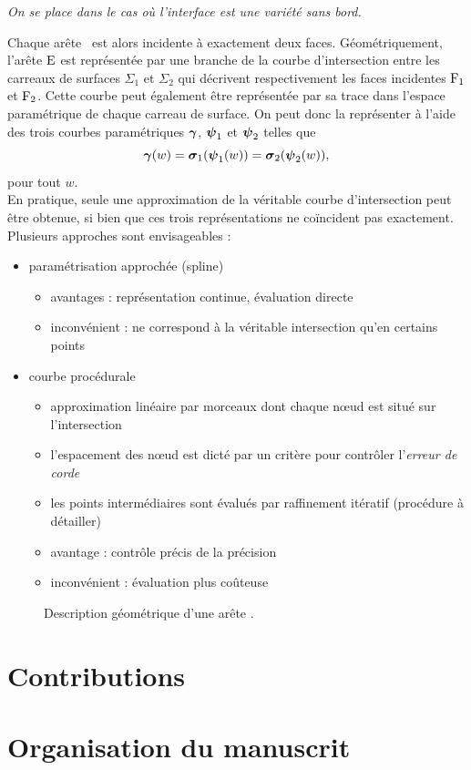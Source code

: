 \par\bigskip
\textit{On se place dans le cas où l'interface est une variété sans bord.}\par
Chaque arête \brep\ est alors incidente à exactement deux faces. 
Géométriquement, l'arête $\mathrm{E}$ est représentée par une branche de la courbe d'intersection entre les carreaux de surfaces $\Sigma_1$ et $\Sigma_2$ qui décrivent respectivement les faces incidentes $\mathrm{F}_1$ et $\mathrm{F}_2$. 
Cette courbe peut également être représentée par sa trace dans l'espace paramétrique de chaque carreau de surface. 
On peut donc la représenter à l'aide des trois courbes paramétriques $\boldsymbol{\gamma}$, $\boldsymbol{\psi}_1$ et $\boldsymbol{\psi}_2$ telles que
\begin{equation}
	\boldsymbol{\gamma}(w) = \boldsymbol{\sigma}_1(\boldsymbol{\psi}_1(w)) = \boldsymbol{\sigma}_2(\boldsymbol{\psi}_2(w)),
\end{equation}
pour tout $w$.\\
En pratique, seule une approximation de la véritable courbe d'intersection peut être obtenue, si bien que ces trois représentations ne coïncident pas exactement.
Plusieurs approches sont envisageables :
\begin{itemize}
	\item paramétrisation approchée (\eg spline)
	\begin{itemize}
		\item avantages : représentation continue, évaluation directe
		\item inconvénient : ne correspond à la véritable intersection qu'en certains points
	\end{itemize}
	\item courbe procédurale
	\begin{itemize}
		\item approximation linéaire par morceaux dont chaque n\oe ud est situé  sur l'intersection
		\item l'espacement des n\oe ud est dicté par un critère pour contrôler l'\textit{erreur de corde}
		\item les points intermédiaires sont évalués par raffinement itératif (procédure à détailler)
		\item avantage : contrôle précis de la précision
		\item inconvénient : évaluation plus coûteuse 
	\end{itemize}
\end{itemize}



\begin{figure}
\centering

\caption{Description géométrique d'une arête \brep.}
\end{figure}


\section{Contributions}%


\section{Organisation du manuscrit}